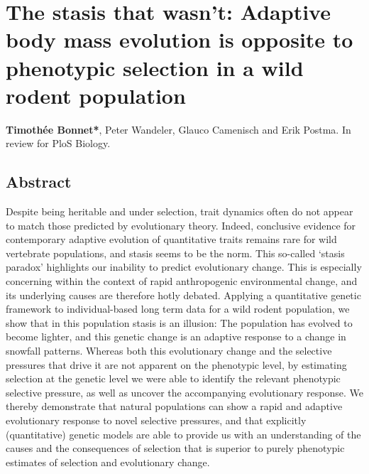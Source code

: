 

\chapter[\texorpdfstring{Chapter 4 \\ The stasis that wasn't: Adaptive body mass evolution is opposite to phenotypic selection in a wild rodent population}{Chapter 4 -- The stasis that wasn't: Adaptive body mass evolution is opposite to phenotypic selection in a wild rodent population}]{The stasis that wasn't: Adaptive body mass evolution is opposite to phenotypic selection in a wild rodent population}
\label{chap:stasis}

\textbf{Timoth\'{e}e Bonnet*}, Peter Wandeler, Glauco Camenisch and Erik Postma. In review for PloS Biology. 

\section{Abstract}
Despite being heritable and under selection, trait dynamics often do not appear to match those predicted by evolutionary theory. Indeed, conclusive evidence for contemporary adaptive evolution of quantitative traits remains rare for wild vertebrate populations, and stasis seems to be the norm. 
This so-called `stasis paradox' highlights our inability to predict evolutionary change. This is especially concerning within the context of rapid anthropogenic environmental change, and its underlying causes are therefore hotly debated.
Applying a quantitative genetic framework to individual-based long term data for a wild rodent population, we show that in this population stasis is an illusion: The population has evolved to become lighter, and this genetic change is an adaptive response to a change in snowfall patterns. Whereas both this evolutionary change and the selective pressures that drive it are not apparent on the phenotypic level, by estimating selection at the genetic level we were able to identify the relevant phenotypic selective pressure, as well as uncover the accompanying evolutionary response.
We thereby demonstrate that natural populations can show a rapid and adaptive evolutionary response to novel selective pressures, and that explicitly (quantitative) genetic models are able to provide us with an understanding of the causes and the consequences of selection that is superior to purely phenotypic estimates of selection and evolutionary change.


